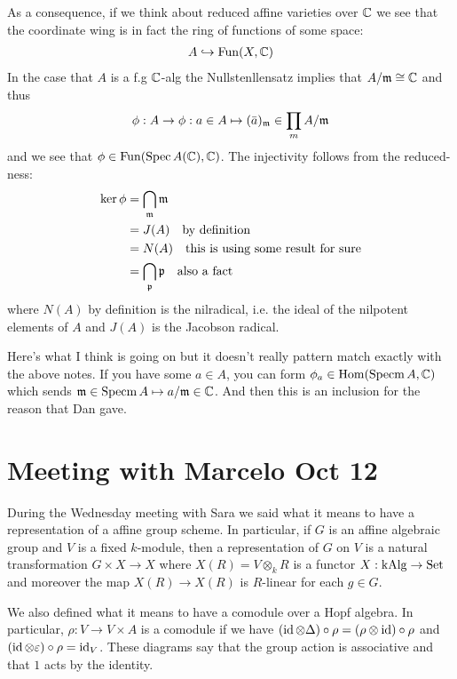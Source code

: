 \documentclass[12pt]{article}
\begin{document}
As a consequence, if we think about reduced affine varieties over $\mathbb{C}$ we see that the coordinate wing is in fact the ring of functions of some space: \begin{align*}
    A\hookrightarrow \operatorname{Fun}(X,\mathbb{C})
\end{align*} In the case that $A$ is a f.g $\mathbb{C}$-alg the Nullstenllensatz implies that $A/\mathfrak{m}\cong\mathbb{C}$ and thus \begin{align*}
    \phi: A\to 
    \phi: a\in A\mapsto (\bar a)_{\mathfrak{m}} \in \prod_m A/\mathfrak{m} 
\end{align*} and we see that $\phi\in \operatorname{Fun}(\operatorname{Spec} A(\mathbb{C}), \mathbb{C})$. The injectivity follows from the reduced-ness: \begin{align*}
    \ker\phi &= \bigcap_{\mathfrak{m}} \mathfrak{m}\\
    &= J(A) \text{\quad by definition}\\
    &= N(A) \text{\quad this is using some result for sure} \\
    &= \bigcap_{\mathfrak{p}}\mathfrak{p} \text{\quad also a fact}
\end{align*} where $N(A)$ by definition is the nilradical, i.e. the ideal of the nilpotent elements of $A$ and $J(A)$ is the Jacobson radical.
\begin{remark}
\end{remark}

\hfill

Here's what I think is going on but it doesn't really pattern match exactly with the above notes. If you have some $a\in A$, you can form $\phi_a\in\operatorname{Hom}(\operatorname{Specm} A,\mathbb{C})$ which sends $\mathfrak{m} \in\operatorname{Specm} A\mapsto a/\mathfrak{m} \in \mathbb{C}$. And then this is an inclusion for the reason that Dan gave.

\section{Meeting with Marcelo Oct 12}
During the Wednesday meeting with Sara we said what it means to have a representation of a affine group scheme. In particular, if $G$ is an affine algebraic group and $V$ is a fixed $k$-module, then a representation of $G$ on $V$ is a natural transformation $G\times X\to X$ where $X(R) = V\otimes_k R$ is a functor $X:\operatorname{kAlg}\to\operatorname{Set}$ and moreover the map $X(R)\to X(R)$ is $R$-linear for each $g\in G$.

\hfill 

We also defined what it means to have a comodule over a Hopf algebra. In particular, $\rho:V\to V\times A$ is a comodule if we have $(\operatorname{id}\otimes\Delta)\circ\rho = (\rho\otimes\operatorname{id})\circ\rho$ and $(\operatorname{id}\otimes\varepsilon)\circ\rho = \operatorname{id}_V$. These diagrams say that the group action is associative and that $1$ acts by the identity.
\end{document}
